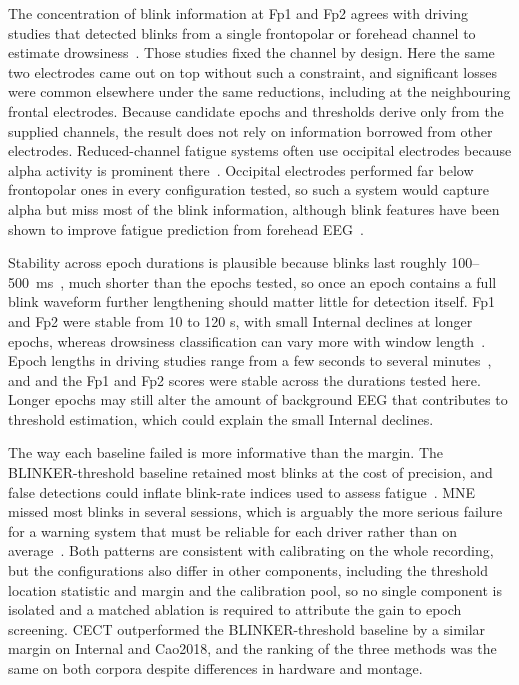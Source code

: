 \documentclass[journal,twoside,web]{ieeecolor}
\begin{document}
The concentration of blink information at Fp1 and Fp2 agrees with driving studies that detected blinks from a single frontopolar or forehead channel to estimate drowsiness~\citep{ko2020eyeblink,shahbakhti2022simultaneous,shahbakhti2023fusion}. Those studies fixed the channel by design. Here the same two electrodes came out on top without such a constraint, and significant losses were common elsewhere under the same reductions, including at the neighbouring frontal electrodes. Because candidate epochs and thresholds derive only from the supplied channels, the result does not rely on information borrowed from other electrodes. Reduced-channel fatigue systems often use occipital electrodes because alpha activity is prominent there~\citep{simon2011eeg,lin2014wireless,li2015context}. Occipital electrodes performed far below frontopolar ones in every configuration tested, so such a system would capture alpha but miss most of the blink information, although blink features have been shown to improve fatigue prediction from forehead EEG~\citep{ko2020eyeblink}.

Stability across epoch durations is plausible because blinks last roughly 100--500~ms~\citep{chang2016detection}, much shorter than the epochs tested, so once an epoch contains a full blink waveform further lengthening should matter little for detection itself. Fp1 and Fp2 were stable from 10 to 120 s, with small Internal declines at longer epochs, whereas drowsiness classification can vary more with window length~\citep{lee2023lstm}. Epoch lengths in driving studies range from a few seconds to several minutes~\citep{ahn2016exploring,chai2017improving,lan2024driving}, and and the Fp1 and Fp2 scores were stable across the durations tested here. Longer epochs may still alter the amount of background EEG that contributes to threshold estimation, which could explain the small Internal declines.

The way each baseline failed is more informative than the margin. The BLINKER-threshold baseline retained most blinks at the cost of precision, and false detections could inflate blink-rate indices used to assess fatigue~\citep{tian2021fatigue}. MNE missed most blinks in several sessions, which is arguably the more serious failure for a warning system that must be reliable for each driver rather than on average~\citep{ingre2006subjective}. Both patterns are consistent with calibrating on the whole recording, but the configurations also differ in other components, including the threshold location statistic and margin and the calibration pool, so no single component is isolated and a matched ablation is required to attribute the gain to epoch screening. CECT outperformed the BLINKER-threshold baseline by a similar margin on Internal and Cao2018, and the ranking of the three methods was the same on both corpora despite differences in hardware and montage.
\end{document}
